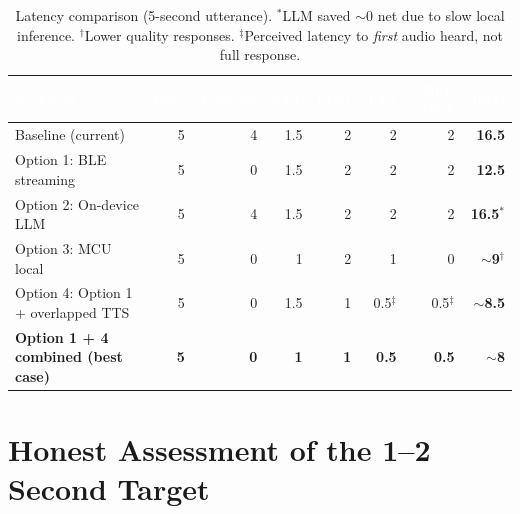\documentclass[12pt,a4paper]{article}
\begin{document}
\begin{table}[h!]
\centering
\renewcommand{\arraystretch}{1.5}
\begin{tabularx}{\linewidth}{|X|r|r|r|r|r|r|r|}
\hline
\rowcolor{primary}
\textcolor{white}{\textbf{Scenario}} &
\textcolor{white}{\textbf{Rec.}} &
\textcolor{white}{\textbf{Transfer}} &
\textcolor{white}{\textbf{STT}} &
\textcolor{white}{\textbf{LLM}} &
\textcolor{white}{\textbf{TTS}} &
\textcolor{white}{\textbf{BLE back}} &
\textcolor{white}{\textbf{Total}} \\
\hline
Baseline (current) & 5 & 4 & 1.5 & 2 & 2 & 2 & \textbf{16.5} \\
\hline
\rowcolor{rowalt}
Option 1: BLE streaming & 5 & 0 & 1.5 & 2 & 2 & 2 & \textbf{12.5} \\
\hline
Option 2: On-device LLM & 5 & 4 & 1.5 & 2 & 2 & 2 & \textbf{16.5}$^*$ \\
\hline
\rowcolor{rowalt}
Option 3: MCU local & 5 & 0 & 1 & 2 & 1 & 0 & \textbf{$\sim$9}$^\dagger$ \\
\hline
Option 4: Option 1 + overlapped TTS & 5 & 0 & 1.5 & 1 & 0.5$^\ddagger$ & 0.5$^\ddagger$ & \textbf{$\sim$8.5} \\
\hline
\rowcolor{rowalt}
\textbf{Option 1 + 4 combined (best case)} & \textbf{5} & \textbf{0} & \textbf{1} & \textbf{1} & \textbf{0.5} & \textbf{0.5} & \textbf{$\sim$8} \\
\hline
\end{tabularx}
\caption{Latency comparison (5-second utterance). $^*$LLM saved $\sim$0 net due to slow local inference. $^\dagger$Lower quality responses. $^\ddagger$Perceived latency to \emph{first} audio heard, not full response.}
\end{table}

\section{Honest Assessment of the 1--2 Second Target}
\end{document}
